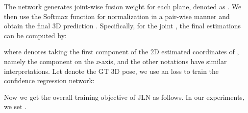 The network generates joint-wise fusion weight for each plane, denoted as . We then use the Softmax function for normalization in a pair-wise manner and obtain the final 3D prediction . Specifically, for the joint , the final estimations can be computed by: 

where  denotes taking the first component of the 2D estimated coordinates of , namely the component on the \textit{x}-axis, and the other notations have similar interpretations. Let  denote the GT 3D pose, we use an  loss to train the confidence regression network:


Now we get the overall training objective of JLN as follows. In our experiments, we set .


